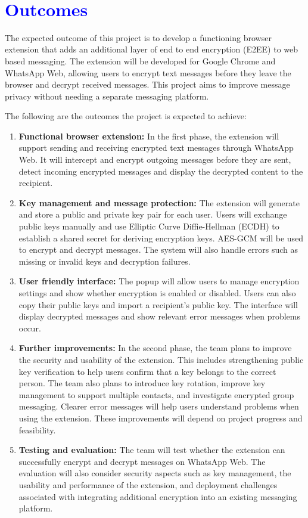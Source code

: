 \documentclass[11pt]{article}
\newcommand{\tb}{\textcolor{blue}}
\begin{document}
~\\
\section{\tb{Outcomes}}

The expected outcome of this project is to develop a functioning browser extension that adds an additional layer of end to end encryption (E2EE) to web based messaging. The extension will be developed for Google Chrome and WhatsApp Web, allowing users to encrypt text messages before they leave the browser and decrypt received messages. This project aims to improve message privacy without needing a separate messaging platform.

\noindent The following are the outcomes the project is expected to achieve:

\begin{enumerate}
    \item \textbf{Functional browser extension:} In the first phase, the extension will support sending and receiving encrypted text messages through WhatsApp Web. It will intercept and encrypt outgoing messages before they are sent, detect incoming encrypted messages and display the decrypted content to the recipient.

    \item \textbf{Key management and message protection:} The extension will generate and store a public and private key pair for each user. Users will exchange public keys manually and use Elliptic Curve Diffie-Hellman (ECDH) to establish a shared secret for deriving encryption keys. AES-GCM will be used to encrypt and decrypt messages. The system will also handle errors such as missing or invalid keys and decryption failures.

    \item \textbf{User friendly interface:} The popup will allow users to manage encryption settings and show whether encryption is enabled or disabled. Users can also copy their public keys and import a recipient's public key. The interface will display decrypted messages and show relevant error messages when problems occur.

    \item \textbf{Further improvements:} In the second phase, the team plans to improve the security and usability of the extension. This includes strengthening public key verification to help users confirm that a key belongs to the correct person. The team also plans to introduce key rotation, improve key management to support multiple contacts, and investigate encrypted group messaging. Clearer error messages will help users understand problems when using the extension. These improvements will depend on project progress and feasibility.

    \item \textbf{Testing and evaluation:} The team will test whether the extension can successfully encrypt and decrypt messages on WhatsApp Web. The evaluation will also consider security aspects such as key management, the usability and performance of the extension, and deployment challenges associated with integrating additional encryption into an existing messaging platform.
\end{enumerate}
\end{document}
